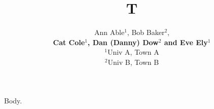 \documentclass{article}
\begin{document}
\title{T}
\author{Ann Able$^{1}$, Bob Baker$^{2}$, \\
\textbf{Cat Cole$^{1}$, Dan (Danny) Dow$^{2}$ and Eve Ely$^{1}$} \\
$^1$Univ A, Town A\\
$^2$Univ B, Town B}
\maketitle
Body.
\end{document}
